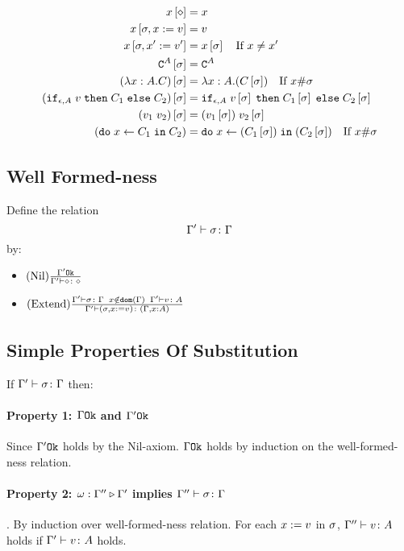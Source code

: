 {        
        \begin{align}
            x\left[\diamond\right] & = x \\
            x\left[\sigma,x:= v\right] & = v \\
            x\left[\sigma,x':= v'\right] & = x\left[\sigma\right]\quad\text{If }x \neq x'\\
            \texttt{C}^{A}\left[\sigma\right] & = \texttt{C}^{A} \\
            (\lambda x : A. C)\left[\sigma\right] &= \lambda x : A. (C\left[\sigma\right])\quad\text{If }x\#\sigma\\
            (\texttt{if}_{\epsilon, A}\; v\; \texttt{then}\; C_1 \;\texttt{else} \; C_2)\left[\sigma\right] &= \texttt{if}_{\epsilon, A}\; v\left[\sigma\right]\; \texttt{then}\; C_1\left[\sigma\right] \;\texttt{else} \; C_2\left[\sigma\right]\\
            (v_1\; v_2)\left[\sigma\right]&= (v_1\left[\sigma\right])\; v_2\left[\sigma\right]\\
            (\texttt{do}\; x \leftarrow C_1 \;\texttt{in}\; C_2)&= \texttt{do}\; x \leftarrow (C_1\left[\sigma\right]) \;\texttt{in}\; (C_2\left[\sigma\right])\quad\text{If } x\#\sigma\\
        \end{align}
    \subsection{Well Formed-ness}
    Define the relation $$\Gamma' \vdash \sigma \colon \Gamma$$ by:

    \begin{itemize}
        \item $(\text{Nil}) \frac{\Gamma' \texttt{Ok}}{\Gamma' \vdash \diamond \colon \diamond}$
        \item $(\text{Extend}) \frac{
            \Gamma' \vdash \sigma \colon \Gamma
            \;\;
            x\notin\texttt{dom}(\Gamma)
            \;\;
            \Gamma' \vdash v \colon A
        }{
            \Gamma' \vdash (\sigma, x := v) \colon (\Gamma, x: A)
        }$
    \end{itemize}
    \subsection{Simple Properties Of Substitution}
    If $\Gamma' \vdash \sigma \colon \Gamma$ then:

        \paragraph{Property 1: $\Gamma \texttt{Ok}$ and $\Gamma' \texttt{Ok}$}
         Since $\Gamma' \texttt{Ok}$ holds by the Nil-axiom. $\Gamma \texttt{Ok}$ holds by induction on the well-formed-ness relation.
        \paragraph{Property 2: $\omega : \Gamma'' \triangleright \Gamma'$ implies $\Gamma'' \vdash \sigma \colon \Gamma$}. 
        By induction over well-formed-ness relation. For each $x:= v$ in $\sigma$, $\Gamma'' \vdash v \colon A$ holds if $\Gamma' \vdash v \colon A$ holds.
}
